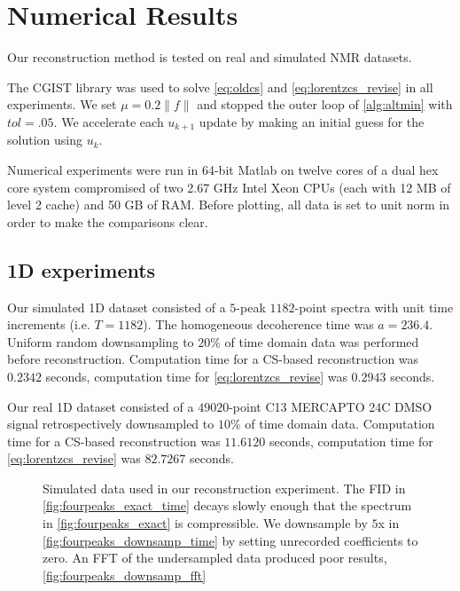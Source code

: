 \documentclass[11pt]{article}
\begin{document}
\section{Numerical Results}

    Our reconstruction method is tested on real and simulated NMR datasets.

    The CGIST library \cite{Goldsteina} was used to solve \cref{eq:oldcs} and \cref{eq:lorentzcs_revise} in all experiments. We set $\mu = 0.2 \|f\|$ and stopped the outer loop of \cref{alg:altmin} with $tol=.05$. We accelerate each $u_{k+1}$ update by making an initial guess for the solution using $u_k$.

   Numerical experiments were run in 64-bit Matlab on twelve cores of a dual hex core system compromised of two 2.67 GHz Intel Xeon CPUs (each with 12 MB of level 2 cache) and 50 GB of RAM. Before plotting, all data is set to unit norm in order to make the comparisons clear.

    \subsection{1D experiments}

    Our simulated 1D dataset consisted of a $5$-peak $1182$-point spectra with unit time increments (i.e. $T=1182$). The homogeneous decoherence time was $a=236.4$. Uniform random downsampling to $20\%$ of time domain data was performed before reconstruction. Computation time for a CS-based reconstruction was $0.2342$ seconds, computation time for \cref{eq:lorentzcs_revise} was $0.2943$ seconds.

    Our real 1D dataset consisted of a $49020$-point C13 MERCAPTO 24C DMSO signal retrospectively downsampled to $10\%$ of time domain data. Computation time for a CS-based reconstruction was $11.6120$ seconds, computation time for \cref{eq:lorentzcs_revise} was $82.7267$ seconds.


\begin{figure}
\centering
{}
\qquad
{}
\qquad
{}
\qquad
{}
\qquad
\caption{Simulated data used in our reconstruction experiment. The FID in \cref{fig:fourpeaks_exact_time} decays slowly enough that the spectrum in \cref{fig:fourpeaks_exact} is compressible. We downsample by $5$x in \cref{fig:fourpeaks_downsamp_time} by setting unrecorded coefficients to zero. An FFT of the undersampled data produced poor results, \cref{fig:fourpeaks_downsamp_fft}}
\label{fig:simulated_data}
\end{figure}
\end{document}
